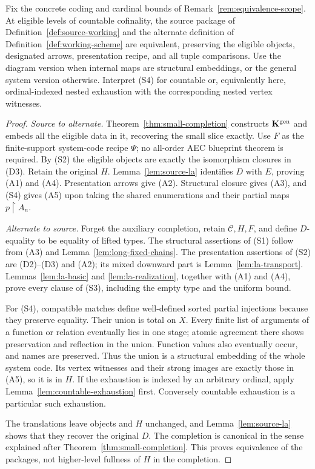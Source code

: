\begin{theorem}\label{thm:working-equivalence}
Fix the concrete coding and cardinal bounds of
Remark~\ref{rem:equivalence-scope}. At eligible levels of countable
cofinality, the source package of Definition~\ref{def:source-working}
and the alternate definition of Definition~\ref{def:working-scheme}
are equivalent, preserving the eligible objects, designated arrows,
presentation recipe, and all tuple comparisons. Use the diagram version
when internal maps are structural embeddings, or the general system
version otherwise. Interpret (S4) for countable or, equivalently here,
ordinal-indexed nested exhaustion with the corresponding nested
vertex witnesses.
\end{theorem}
\begin{proof}
\emph{Source to alternate.} Theorem~\ref{thm:small-completion} constructs
$\mathbf K^{\mathrm{gen}}$ and embeds all the eligible data in it, recovering
the small slice exactly. Use $F$ as the finite-support system-code
recipe $\Psi$; no all-order AEC blueprint theorem is required. By (S2)
the eligible objects are exactly the isomorphism closures in (D3).
Retain the original $H$. Lemma~\ref{lem:source-la} identifies $D$ with
$E$, proving (A1) and (A4). Presentation arrows give (A2).
Structural closure gives (A3), and (S4) gives (A5) upon taking the
shared enumerations and their partial maps $p\restriction A_n$.

\emph{Alternate to source.} Forget the auxiliary completion, retain
$\mathcal C,H,F$, and define $D$-equality to be equality of lifted types.
The structural assertions of (S1) follow from (A3) and
Lemma~\ref{lem:long-fixed-chains}. The presentation assertions of (S2)
are (D2)--(D3) and (A2); its mixed downward part is
Lemma~\ref{lem:la-transport}. Lemmas~\ref{lem:la-basic} and
\ref{lem:la-realization}, together with (A1) and (A4), prove every
clause of (S3), including the empty type and the uniform bound.

For (S4), compatible matches define well-defined sorted partial
injections because they preserve equality. Their union is total on
$X$. Every finite list of arguments of a function or relation eventually
lies in one stage; atomic agreement there shows preservation and
reflection in the union. Function values also eventually occur, and
names are preserved. Thus the union is a structural embedding of the
whole system code. Its vertex witnesses and their strong images are
exactly those in (A5), so it is in $H$. If the exhaustion is indexed by
an arbitrary ordinal, apply Lemma~\ref{lem:countable-exhaustion} first.
Conversely countable exhaustion is a particular such exhaustion.

The translations leave objects and $H$ unchanged, and
Lemma~\ref{lem:source-la} shows that they recover the original $D$.
The completion is canonical in the sense explained after
Theorem~\ref{thm:small-completion}. This proves equivalence of the
packages, not higher-level fullness of $H$ in the completion.
\end{proof}

